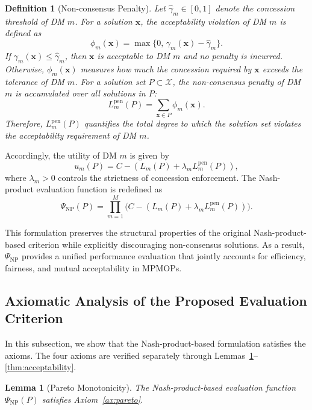 \documentclass[journal]{IEEEtran}
\newtheorem{definition}{Definition}
\newtheorem{lemma}{Lemma}
\begin{document}
\begin{definition}[Non-consensus Penalty]
		\label{def:non_consensus_penalty} 
		Let $\hat{\gamma}_m\in[0,1]$ denote the concession threshold of DM $m$. For a solution $\mathbf{x}$, the acceptability violation of DM $m$ is defined as 
		\begin{equation} 
			\phi_m(\mathbf{x}) = \max\{0,\,\gamma_m(\mathbf{x})-\hat{\gamma}_m\}. 
		\end{equation} 
		If $\gamma_m(\mathbf{x})\leq \hat{\gamma}_m$, then $\mathbf{x}$ is acceptable to DM $m$ and no penalty is incurred. Otherwise, $\phi_m(\mathbf{x})$ measures how much the concession required by $\mathbf{x}$ exceeds the tolerance of DM $m$. For a solution set $P\subset\mathcal{X}$, the non-consensus penalty of DM $m$ is accumulated over all solutions in $P$: 
		\begin{equation} 
			L_m^{\mathrm{pen}}(P) = \sum_{\mathbf{x}\in P} \phi_m(\mathbf{x}).
		\end{equation} 
		Therefore, $L_m^{\mathrm{pen}}(P)$ quantifies the total degree to which the solution set violates the acceptability requirement of DM $m$. 
	\end{definition}

Accordingly, the utility of DM $m$ is given by
\[
u_m(P)
=
C - (L_m(P) + \lambda_m L_m^{\mathrm{pen}}(P)),
\]
where $\lambda_m > 0$ controls the strictness of concession enforcement. The Nash-product evaluation function is redefined as
\[
\Psi_{\mathrm{NP}}(P)
=
\prod_{m=1}^{M}
\bigl(C - (L_m(P) + \lambda_m L_m^{\mathrm{pen}}(P))\bigr).
\]

This formulation preserves the structural properties of the original Nash-product-based criterion while explicitly discouraging non-consensus solutions. As a result, $\Psi_{\mathrm{NP}}$ provides a unified performance evaluation that jointly accounts for efficiency, fairness, and mutual acceptability in MPMOPs.

\subsection{Axiomatic Analysis of the Proposed Evaluation Criterion}

In this subsection, we show that the Nash-product-based formulation satisfies the axioms. The four axioms are verified separately through Lemmas~\ref{thm:pareto}--\ref{thm:acceptability}.

\begin{lemma}[Pareto Monotonicity]
	\label{thm:pareto}
	The Nash-product-based evaluation function $\Psi_{\mathrm{NP}}(P)$ satisfies Axiom~\ref{ax:pareto}.
\end{lemma}
\end{document}
